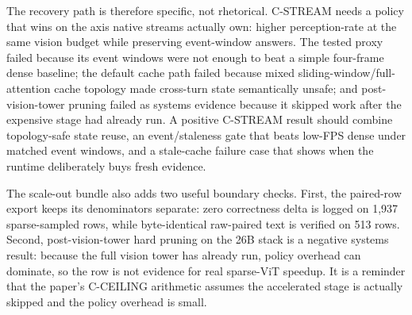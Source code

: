 The recovery path is therefore specific, not rhetorical. C-STREAM needs a
policy that wins on the axis native streams actually own: higher
perception-rate at the same vision budget while preserving event-window
answers. The tested proxy failed because its event windows were not enough to
beat a simple four-frame dense baseline; the default cache path failed because
mixed sliding-window/full-attention cache topology made cross-turn state
semantically unsafe; and post-vision-tower pruning failed as systems evidence
because it skipped work after the expensive stage had already run. A positive
C-STREAM result should combine topology-safe state reuse, an event/staleness
gate that beats low-FPS dense under matched event windows, and a stale-cache
failure case that shows when the runtime deliberately buys fresh evidence.



The scale-out bundle also adds two useful boundary checks. First, the paired-row
export keeps its denominators separate: zero correctness delta is logged on
1,937 sparse-sampled rows, while byte-identical raw-paired text is verified on
513 rows. Second, post-vision-tower hard pruning
on the 26B stack is a negative systems result: because the full vision tower has
already run, policy overhead can dominate, so the row is not evidence for real
sparse-ViT speedup. It is a reminder that the paper's C-CEILING arithmetic
assumes the accelerated stage is actually skipped and the policy overhead is
small.
